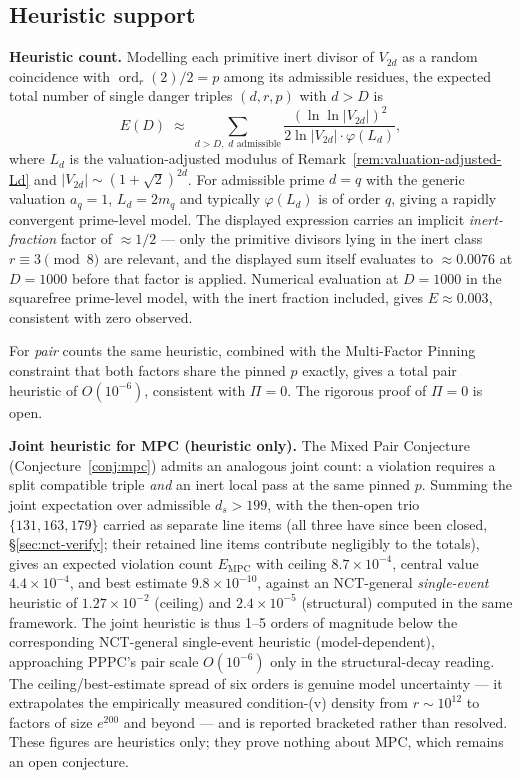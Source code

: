 \documentclass[11pt]{amsart}
\theoremstyle{plain}
\theoremstyle{definition}
\theoremstyle{remark}
\numberwithin{equation}{section}
\newcommand{\ord}{\operatorname{ord}}
\begin{document}
\subsection{Heuristic support}\label{sec:heuristic}

\textbf{Heuristic count.} Modelling each primitive inert divisor of $V_{2 d}$ as a random coincidence with $\ord_r(2)/2 = p$ among its admissible residues, the expected total number of single danger triples $(d, r, p)$ with $d > D$ is
\[
  E(D) \;\approx\; \sum_{d > D,\; d \text{ admissible}} \frac{(\ln \ln |V_{2 d}|)^2}{2 \ln |V_{2 d}| \cdot \varphi(L_d)},
\]
where $L_d$ is the valuation-adjusted modulus of Remark~\ref{rem:valuation-adjusted-Ld} and $|V_{2 d}| \sim (1 + \sqrt 2)^{2 d}$. For admissible prime $d = q$ with the generic valuation $a_q=1$, $L_d = 2m_q$ and typically $\varphi(L_d)$ is of order $q$, giving a rapidly convergent prime-level model. The displayed expression carries an implicit \emph{inert-fraction} factor of $\approx 1/2$ --- only the primitive divisors lying in the inert class $r \equiv 3 \pmod 8$ are relevant, and the displayed sum itself evaluates to $\approx 0.0076$ at $D = 1000$ before that factor is applied. Numerical evaluation at $D = 1000$ in the squarefree prime-level model, with the inert fraction included, gives $E \approx 0.003$, consistent with zero observed.

For \emph{pair} counts the same heuristic, combined with the Multi-Factor Pinning constraint that both factors share the pinned $p$ exactly, gives a total pair heuristic of $O(10^{-6})$, consistent with $\Pi = 0$. The rigorous proof of $\Pi = 0$ is open.

\textbf{Joint heuristic for MPC (heuristic only).} The Mixed Pair Conjecture (Conjecture~\ref{conj:mpc}) admits an analogous joint count: a violation requires a split compatible triple \emph{and} an inert local pass at the same pinned $p$. Summing the joint expectation over admissible $d_s > 199$, with the then-open trio $\{131, 163, 179\}$ carried as separate line items (all three have since been closed, \S\ref{sec:nct-verify}; their retained line items contribute negligibly to the totals), gives an expected violation count $E_{\mathrm{MPC}}$ with ceiling $8.7 \times 10^{-4}$, central value $4.4 \times 10^{-4}$, and best estimate $9.8 \times 10^{-10}$, against an NCT-general \emph{single-event} heuristic of $1.27 \times 10^{-2}$ (ceiling) and $2.4 \times 10^{-5}$ (structural) computed in the same framework. The joint heuristic is thus 1--5 orders of magnitude below the corresponding NCT-general single-event heuristic (model-dependent), approaching PPPC's pair scale $O(10^{-6})$ only in the structural-decay reading. The ceiling/best-estimate spread of six orders is genuine model uncertainty --- it extrapolates the empirically measured condition-(v) density from $r \sim 10^{12}$ to factors of size $e^{200}$ and beyond --- and is reported bracketed rather than resolved. These figures are heuristics only; they prove nothing about MPC, which remains an open conjecture.
\end{document}
